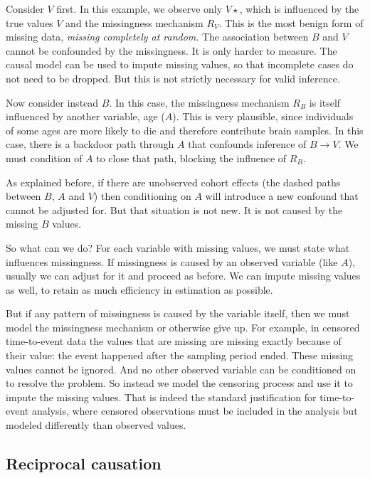\documentclass[reqno ,11pt]{amsart}
\begin{document}
Consider $V$ first. In this example, we observe only $V\star$, which is influenced by the true values $V$ and the missingness mechanism $R_V$. This is the most benign form of missing data, \emph{missing completely at random}. The association between $B$ and $V$ cannot be confounded by the missingness. It is only harder to measure. The causal model can be used to impute missing values, so that incomplete cases do not need to be dropped. But this is not strictly necessary for valid inference.

Now consider instead $B$. In this case, the missingness mechanism $R_B$ is itself influenced by another variable, age ($A$). This is very plausible, since individuals of some ages are more likely to die and therefore contribute brain samples. In this case, there is a backdoor path through $A$ that confounds inference of $B \rightarrow V$. We must condition of $A$ to close that path, blocking the influence of $R_B$. 

As explained before, if there are unobserved cohort effects (the dashed paths between $B$, $A$ and $V$) then conditioning on $A$ will introduce a new confound that cannot be adjusted for. But that situation is not new. It is not caused by the missing $B$ values.

So what can we do? For each variable with missing values, we must state what influences missingness. If missingness is caused by an observed variable (like $A$), usually we can adjust for it and proceed as before. We can impute missing values as well, to retain as much efficiency in estimation as possible. 

But if any pattern of missingness is caused by the variable itself, then we must model the missingness mechanism or otherwise give up. For example, in censored time-to-event data the values that are missing are missing exactly because of their value: the event happened after the sampling period ended. These missing values cannot be ignored. And no other observed variable can be conditioned on to resolve the problem. So instead we model the censoring process and use it to impute the missing values. That is indeed the standard justification for time-to-event analysis, where censored observations must be included in the analysis but modeled differently than observed values.

\subsection{Reciprocal causation}
\end{document}
